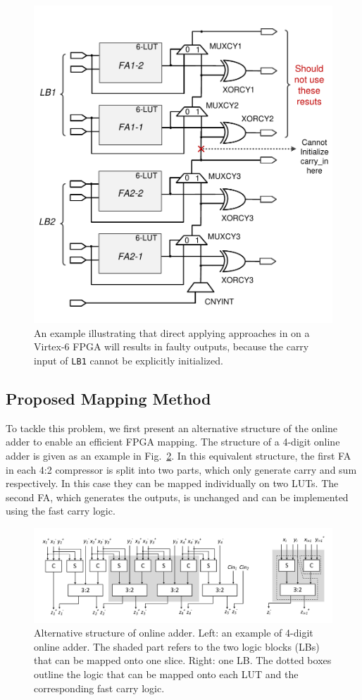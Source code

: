 \documentclass[conference]{IEEEtran}
\begin{document}
\begin{figure}[tbp]
	\centering
	\includegraphics[width=.45\textwidth]{./Figures/SDadder_FastCarry_PreviousWork2.pdf}
	\vspace{-1ex}
	\caption{An example illustrating that direct applying approaches in \cite{FPT09RA} on a Virtex-6 FPGA will results in faulty outputs, because the carry input of \texttt{LB1} cannot be explicitly initialized.}
	\label{Fig:PreWorkVirtex6}
    \vspace{-1ex}
\end{figure}

\subsection{Proposed Mapping Method}
To tackle this problem, we first present an alternative structure of the online adder to enable an efficient FPGA mapping. The structure of a 4-digit online adder is given as an example in Fig.~\ref{Fig:ModifiedOA}. In this equivalent structure, the first FA in each 4:2 compressor is split into two parts, which only generate carry and sum respectively. In this case they can be mapped individually on two LUTs. The second FA, which generates the outputs, is unchanged and can be implemented using the fast carry logic.



\begin{figure}[tbp]
	\centering
	\includegraphics[width=.85\textwidth]{./Figures/SDadder_FPGA_New_4digit2.pdf}
	\vspace{-2ex}
	\caption{Alternative structure of online adder. Left: an example of 4-digit online adder. The shaded part refers to the two logic blocks (LBs) that can be mapped onto one slice. Right: one LB. The dotted boxes outline the logic that can be mapped onto each LUT and the corresponding fast carry logic.}
	\vspace{-2ex}	
	\label{Fig:ModifiedOA}
\end{figure}
\end{document}
